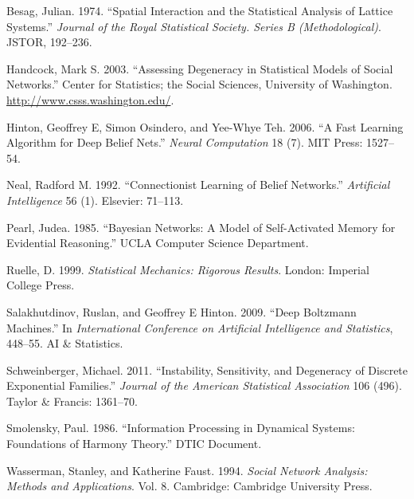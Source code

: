 \documentclass[12pt]{article}
\theoremstyle{definition}
\begin{document}
\hypertarget{refs}{}
\hypertarget{ref-besag1974spatial}{}
Besag, Julian. 1974. ``Spatial Interaction and the Statistical Analysis
of Lattice Systems.'' \emph{Journal of the Royal Statistical Society.
Series B (Methodological)}. JSTOR, 192--236.

\hypertarget{ref-handcock2003assessing}{}
Handcock, Mark S. 2003. ``Assessing Degeneracy in Statistical Models of
Social Networks.'' Center for Statistics; the Social Sciences,
University of Washington. \url{http://www.csss.washington.edu/}.

\hypertarget{ref-hinton2006fast}{}
Hinton, Geoffrey E, Simon Osindero, and Yee-Whye Teh. 2006. ``A Fast
Learning Algorithm for Deep Belief Nets.'' \emph{Neural Computation} 18
(7). MIT Press: 1527--54.

\hypertarget{ref-neal1992connectionist}{}
Neal, Radford M. 1992. ``Connectionist Learning of Belief Networks.''
\emph{Artificial Intelligence} 56 (1). Elsevier: 71--113.

\hypertarget{ref-pearl985bayesian}{}
Pearl, Judea. 1985. ``Bayesian Networks: A Model of Self-Activated
Memory for Evidential Reasoning.'' UCLA Computer Science Department.

\hypertarget{ref-ruelle1999statistical}{}
Ruelle, D. 1999. \emph{Statistical Mechanics: Rigorous Results}. London:
Imperial College Press.

\hypertarget{ref-salakhutdinov2009deep}{}
Salakhutdinov, Ruslan, and Geoffrey E Hinton. 2009. ``Deep Boltzmann
Machines.'' In \emph{International Conference on Artificial Intelligence
and Statistics}, 448--55. AI \& Statistics.

\hypertarget{ref-schweinberger2011instability}{}
Schweinberger, Michael. 2011. ``Instability, Sensitivity, and Degeneracy
of Discrete Exponential Families.'' \emph{Journal of the American
Statistical Association} 106 (496). Taylor \& Francis: 1361--70.

\hypertarget{ref-smolensky1986information}{}
Smolensky, Paul. 1986. ``Information Processing in Dynamical Systems:
Foundations of Harmony Theory.'' DTIC Document.

\hypertarget{ref-wasserman1994social}{}
Wasserman, Stanley, and Katherine Faust. 1994. \emph{Social Network
Analysis: Methods and Applications}. Vol. 8. Cambridge: Cambridge
University Press.
\end{document}
